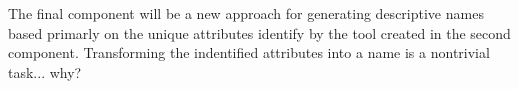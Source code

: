 The final component will be a new approach for generating descriptive names based primarly on the unique attributes identify by the tool created in the second component.
%
Transforming the indentified attributes into a name is a nontrivial task... why?


